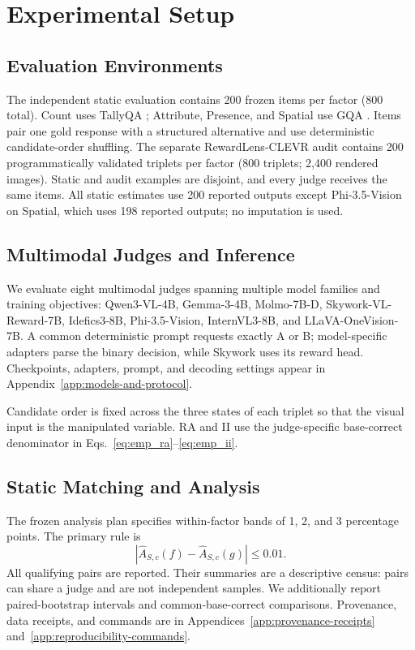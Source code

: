 \section{Experimental Setup}
\label{sec:experimental_setup}

\subsection{Evaluation Environments}
The independent static evaluation contains 200 frozen items per factor (800 total).
Count uses TallyQA \citep{acharya2019tallyqa}; Attribute, Presence, and Spatial
use GQA \citep{hudson2019gqa}. Items pair one gold response with a structured
alternative and use deterministic candidate-order shuffling. The separate
RewardLens-CLEVR audit contains 200 programmatically validated triplets per
factor (800 triplets; 2,400 rendered images). Static and audit examples are
disjoint, and every judge receives the same items. All static estimates use 200
reported outputs except Phi-3.5-Vision on Spatial, which uses 198 reported
outputs; no imputation is used.

\subsection{Multimodal Judges and Inference}
We evaluate eight multimodal judges spanning multiple model families and
training objectives: Qwen3-VL-4B, Gemma-3-4B, Molmo-7B-D,
Skywork-VL-Reward-7B, Idefics3-8B, Phi-3.5-Vision, InternVL3-8B, and
LLaVA-OneVision-7B. A common deterministic prompt requests exactly A or B;
model-specific adapters parse the binary decision, while Skywork uses its
reward head. Checkpoints, adapters, prompt, and decoding settings appear in
Appendix~\ref{app:models-and-protocol}.

Candidate order is fixed across the three states of each triplet so that the
visual input is the manipulated variable. RA and II use the judge-specific
base-correct denominator in Eqs.~\ref{eq:emp_ra}--\ref{eq:emp_ii}.

\subsection{Static Matching and Analysis}
The frozen analysis plan specifies within-factor bands of 1, 2, and 3
percentage points. The primary rule is
\begin{equation}
|\widehat A_{S,c}(f)-\widehat A_{S,c}(g)|\leq0.01.
\label{eq:primary_matching_rule}
\end{equation}
All qualifying pairs are reported. Their summaries are a descriptive census:
pairs can share a judge and are not independent samples. We additionally report
paired-bootstrap intervals and common-base-correct comparisons. Provenance,
data receipts, and commands are in Appendices~\ref{app:provenance-receipts}
and~\ref{app:reproducibility-commands}.
